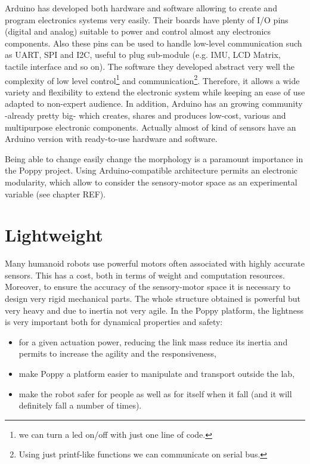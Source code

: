 Arduino has developed both hardware and software allowing to create and program electronics systems very easily. Their boards have plenty of I/O pins (digital and analog) suitable to power and control almost any electronics components. Also these pins can be used to handle low-level communication such as UART, SPI and I2C, useful to plug sub-module (e.g. IMU, LCD Matrix, tactile interface and so on).
The software they developed abstract very well the complexity of low level control\footnote{we can turn a led on/off with just one line of code.} and communication\footnote{Using just printf-like functions we can communicate on serial bus.}. Therefore, it allows a wide variety and flexibility to extend the electronic system while keeping an ease of use adapted to non-expert audience.
In addition, Arduino has an growing community -already pretty big- which creates, shares and produces low-cost, various and multipurpose electronic components. Actually almost of kind of sensors have an Arduino version with ready-to-use hardware and software.

Being able to change easily change the morphology is a paramount importance in the Poppy project. Using Arduino-compatible architecture permits an electronic modularity, which allow to consider the sensory-motor space as an experimental variable (see chapter REF).



\section{Lightweight} %

Many humanoid robots use powerful motors often associated with highly accurate sensors. This has a cost, both in terms of weight and computation resources. Moreover, to ensure the accuracy of the sensory-motor space it is necessary to design very rigid mechanical parts. The whole structure obtained is powerful but very heavy and due to inertia not very agile.
In the Poppy platform, the lightness is very important both for dynamical properties and safety:
\begin{itemize}
    \item for a given actuation power, reducing the link mass reduce its inertia and permits to increase the agility and the responsiveness,
    \item make Poppy a platform easier to manipulate and transport outside the lab,
    \item make the robot safer for people as well as for itself when it fall (and it will definitely fall a number of times).
\end{itemize}

